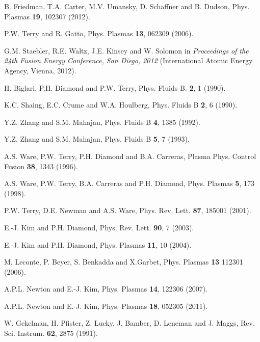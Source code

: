 \documentclass[aip,pop,amsmath,amssymb,preprint,superscriptaddress]{revtex4-1} %
\begin{document}
\begin{thebibliography}{10}
B. Friedman, T.A. Carter, M.V. Umansky, D. Schaffner and B. Dudson, Phys. Plasmas {\bf 19}, 102307 (2012).

P.W. Terry and R. Gatto, Phys. Plasmas {\bf 13}, 062309 (2006).

G.M. Staebler, R.E. Waltz, J.E. Kinsey and W. Solomon in \textit{Proceedings of the 24th Fusion Energy Conference, San Diego, 2012} (International Atomic Energy Agency, Vienna, 2012).

H. Biglari, P.H. Diamond and P.W. Terry, Phys. Fluids B. {\bf 2},  1  (1990).

K.C. Shaing, E.C. Crume and W.A. Houlberg, Phys. Fluids B {\bf 2}, 6 (1990).

Y.Z. Zhang and S.M. Mahajan, Phys. Fluids B {\bf 4}, 1385 (1992).

Y.Z. Zhang and S.M. Mahajan, Phys. Fluids B {\bf 5}, 7 (1993).

A.S. Ware, P.W. Terry, P.H. Diamond and B.A. Carreras, Plasma Phys. Control Fusion {\bf 38},  1343  (1996).

A.S. Ware, P.W. Terry, B.A. Carreras and P.H. Diamond, Phys. Plasmas {\bf 5}, 173 (1998).

P.W. Terry, D.E. Newman and A.S. Ware, Phys. Rev. Lett. {\bf 87}, 185001  (2001).

E.-J. Kim and P.H. Diamond, Phys. Rev. Lett. {\bf 90}, 7 (2003).

E.-J. Kim and P.H. Diamond, Phys. Plasmas {\bf 11},  10  (2004).

M. Leconte, P. Beyer, S. Benkadda and X.Garbet, Phys. Plasmas {\bf 13} 112301 (2006).

A.P.L. Newton and E.-J. Kim, Phys. Plasmas {\bf 14}, 122306 (2007).

A.P.L. Newton and E.-J. Kim, Phys. Plasmas {\bf 18}, 052305 (2011).

W. Gekelman, H. Pfister, Z. Lucky, J. Bamber, D. Leneman and J. Maggs, Rev. Sci. Instrum. {\bf 62},  2875  (1991).




\end{thebibliography}
\end{document}
